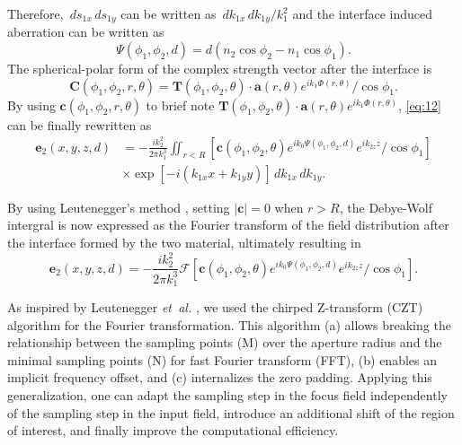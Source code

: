 \documentclass[9pt,twocolumn,twoside]{osajnl}
\begin{document}
Therefore, $\,ds_{1x}\,ds_{1y}$ can be written as $\,dk_{1x}\,dk_{1y}/k_1^2$ and the interface induced aberration can be written as 
\begin{equation}\label{eq:14}
	\Psi(\phi_1,\phi_2,d)=d(n_2\cos\phi_2-n_1\cos\phi_1).
\end{equation}
The spherical-polar form of the complex strength vector after the interface is
\begin{equation}\label{eq:15}
	\mathbf{C}(\phi_1,\phi_2,r,\theta)=\mathbf{T}(\phi_1,\phi_2,\theta)\cdot\mathbf{a}(r,\theta)e^{ik_1\Phi(r,\theta)}/\cos\phi_1.
\end{equation}
By using $\mathbf{c}(\phi_1,\phi_2,r,\theta)$ to brief note $\mathbf{T}(\phi_1,\phi_2,\theta)\cdot\mathbf{a}(r,\theta)e^{ik_1\Phi(r,\theta)}$, \eqref{eq:12} can be finally rewritten as
\begin{equation}
	\begin{aligned}\label{eq:16}
		\mathbf{e}_2(x,y,z,d)&=-\frac{ik^2_2}{2\pi k^3_1}
		\iint_{r<R}[\mathbf{c}(\phi_1,\phi_2,\theta)e^{ik_0\Psi(\phi_1,\phi_2,d)}e^{ik_{2z}z}/\cos\phi_1]\\
		&\times \exp[-i(k_{1x}x+k_{1y}y)]\,dk_{1x}\,dk_{1y}.
	\end{aligned}
\end{equation}

By using Leutenegger's method \cite{leutenegger2006fast}, setting $|\mathbf{c}|=0$ when $r>R$, the Debye-Wolf intergral is now expressed as the Fourier transform of the field distribution after the interface formed by the two material, ultimately resulting in
\begin{equation}\label{eq:17}
	\mathbf{e}_2(x,y,z,d)=-\frac{ik^2_2}{2\pi k^3_1}\mathcal{F}[\mathbf{c}(\phi_1,\phi_2,\theta)e^{ik_0\Psi(\phi_1,\phi_2,d)}e^{ik_{2z}z}/\cos\phi_1].
\end{equation}

As inspired by Leutenegger \emph{et~al.} \cite{leutenegger2006fast}, we used the chirped Z-transform (CZT) algorithm \cite{Bakx2002} for the Fourier transformation. This algorithm (a) allows breaking the relationship between the sampling points (M) over the aperture radius and the minimal sampling points (N) for fast Fourier transform (FFT), (b) enables an implicit frequency offset, and (c) internalizes the zero padding. Applying this generalization, one can adapt the sampling step in the focus field independently of the sampling step in the input field, introduce an additional shift of the region of interest, and finally improve the computational efficiency.
\end{document}
